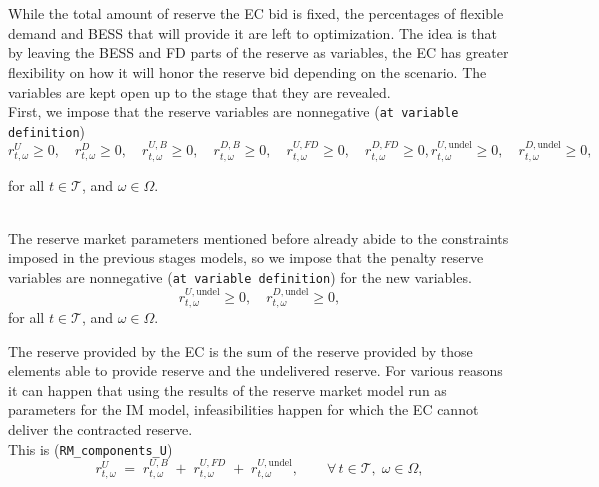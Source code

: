 \documentclass{article}
\begin{document}
\\
\\
While the total amount of reserve the EC bid is fixed, the percentages of flexible demand and BESS that will provide it are left to optimization. The idea is that by leaving the BESS and FD parts of the reserve as variables, the EC has greater flexibility on how it will honor the reserve bid depending on the scenario. The variables are kept open up to the stage that they are revealed.\\
First, we impose that the reserve variables are nonnegative (\verb|at variable definition|)
\begin{equation} \label{EQ:RVarDef}
    r^{U}_{t, \omega} \geq 0, \quad r^{D}_{t, \omega} \geq 0, \quad r^{U, B}_{t, \omega} \geq 0, \quad r^{D, B}_{t, \omega} \geq 0, \quad r^{U, FD}_{t, \omega} \geq 0, \quad r^{D, FD}_{t, \omega} \geq 0, r^{U,\text{undel}}_{t,\omega} \geq 0, \quad r^{D,\text{undel}}_{t,\omega} \geq 0, 
\end{equation}

for all $t \in \mathcal{T}$, and $\omega \in \Omega$. 

\\

The reserve market parameters mentioned before already  abide to the constraints imposed in the previous stages models, so we impose that the penalty reserve variables are nonnegative (\verb|at variable definition|) for the new variables.
\begin{equation} \label{EQ:RVarDef}
    r^{U,\text{undel}}_{t,\omega} \geq 0, \quad r^{D,\text{undel}}_{t,\omega} \geq 0, 
\end{equation}
for all $t \in \mathcal{T}$, and $\omega \in \Omega$. 

The reserve provided by the EC is the sum of the reserve provided by those elements able to provide reserve and the undelivered reserve. For various reasons it can happen that using the results of the reserve market model run as parameters for the IM model, infeasibilities happen for which the EC cannot deliver the contracted reserve.  \\
This is (\verb|RM_components_U|)\\
\begin{equation} \label{EQ:RUcom}
    r^{U}_{t,\omega} \;=\;
        r^{U,B}_{t,\omega}
      \;+\; r^{U,FD}_{t,\omega}
      \;+\; r^{U,\text{undel}}_{t,\omega},
    \qquad \forall\, t\in\mathcal T,\;\omega\in\Omega ,
\end{equation}
\end{document}
